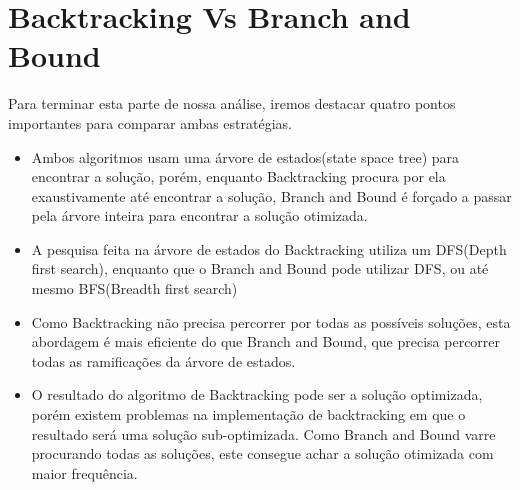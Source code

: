 \section{Backtracking Vs Branch and Bound}

Para terminar esta parte de nossa análise, iremos destacar quatro 
pontos importantes para comparar ambas estratégias.

\begin{itemize}
    \item Ambos algoritmos usam uma árvore de estados(state space tree) para encontrar 
    a solução, porém, enquanto Backtracking procura por ela exaustivamente até encontrar a solução, Branch 
    and Bound é forçado a passar pela árvore inteira para encontrar a solução otimizada.
    \item A pesquisa feita na árvore de estados do Backtracking utiliza 
    um DFS(Depth first search), enquanto que o Branch and Bound pode utilizar 
    DFS, ou até mesmo BFS(Breadth first search)
    \item Como Backtracking não precisa percorrer por todas as 
    possíveis soluções, esta abordagem é mais eficiente do que Branch and Bound,
    que precisa percorrer todas as ramificações da árvore de estados.
    \item O resultado do algoritmo de Backtracking pode ser a solução optimizada,
    porém existem problemas na implementação de backtracking em que o resultado 
    será uma solução sub-optimizada. Como Branch and Bound varre procurando todas as 
    soluções, este consegue achar a solução otimizada com maior frequência.
\end{itemize}
